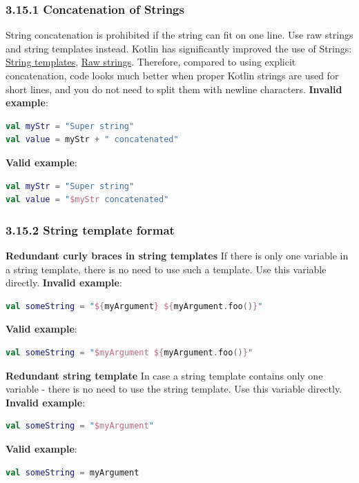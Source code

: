 \subsubsection*{\textbf{3.15.1 Concatenation of Strings}}
\leavevmode\newline
\label{sec:3.15.1}
String concatenation is prohibited if the string can fit on one line. Use raw strings and string templates instead. Kotlin has significantly improved the use of Strings: 
\href{https://kotlinlang.org/docs/reference/basic-types.html#string-templates}{String templates}, \href{https://kotlinlang.org/docs/reference/basic-types.html#string-literals}{Raw strings}.
Therefore, compared to using explicit concatenation, code looks much better when proper Kotlin strings are used for short lines, and you do not need to split them with newline characters.
\textbf{Invalid example}:
\begin{lstlisting}[language=Kotlin]
val myStr = "Super string"
val value = myStr + " concatenated"
\end{lstlisting}
\textbf{Valid example}:
\begin{lstlisting}[language=Kotlin]
val myStr = "Super string"
val value = "$myStr concatenated"
\end{lstlisting}
\subsubsection*{\textbf{3.15.2 String template format}}
\leavevmode\newline
\label{sec:3.15.2}
\textbf{Redundant curly braces in string templates}
If there is only one variable in a string template, there is no need to use such a template. Use this variable directly.
\textbf{Invalid example}:
\begin{lstlisting}[language=Kotlin]
val someString = "${myArgument} ${myArgument.foo()}"
\end{lstlisting}
\textbf{Valid example}:
\begin{lstlisting}[language=Kotlin]
val someString = "$myArgument ${myArgument.foo()}"
\end{lstlisting}
\textbf{Redundant string template}
In case a string template contains only one variable - there is no need to use the string template. Use this variable directly.
\textbf{Invalid example}:
\begin{lstlisting}[language=Kotlin]
val someString = "$myArgument"
\end{lstlisting}
\textbf{Valid example}:
\begin{lstlisting}[language=Kotlin]
val someString = myArgument
\end{lstlisting}
